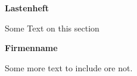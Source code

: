 \begin{titlepage}
 \begin{center}
  
  \Huge
  \textbf{Lastenheft}
  
  \vspace{0.5cm}
  \LARGE
  Some Text on this section
  
  \vspace{1.5cm}
  
  \textbf{Firmenname}
  \vfill
  
  Some more text to include ore not.
  
  \vspace{0.8cm}
\end{center}



\end{titlepage}

